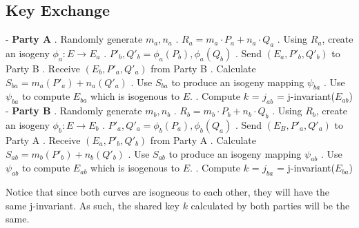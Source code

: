 \documentclass[10pt,twocolumn]{article} %
\begin{document}
\subsection{Key Exchange}

- \textbf{Party A} 
. Randomly generate $ m_{a},n_{a}$
. $R_{a} = m_{a}\cdot P_{a}+n_{a}\cdot Q_{a}$
. Using $R_{a}$, create an isogeny $\phi_{a}: E \rightarrow E_{a}$
. $P'_{b},Q'_{b}=\phi_{a}(P_{b}),\phi_{a}(Q_{b})$
. Send $(E_{a}, P'_{b}, Q'_{b})$ to Party B
. Receive $(E_b, P'_a, Q'_a)$ from Party B
. Calculate $S_{ba} = m_a(P'_a)+n_a(Q'_a)$ 
. Use $S_{ba}$ to produce an isogeny mapping $\psi_{ba}$
. Use $\psi_{ba}$ to compute $E_{ba}$ which is isogenous to $E$.
. Compute $k$ = $j_{ab}$ = j-invariant($E_{ab}$)
\newline
\newline
- \textbf{Party B}
. Randomly generate $ m_{b},n_{b}$
. $R_{b} = m_{b}\cdot P_{b}+n_{b}\cdot Q_{b}$
. Using $R_{b}$, create an isogeny $\phi_{b}: E \rightarrow E_{b}$
. $P'_{a},Q'_{a}=\phi_{b}(P_{a}),\phi_{b}(Q_{a})$
. Send $(E_B, P'_{a}, Q'_{a})$ to Party A
. Receive $(E_a, P'_b, Q'_b)$ from Party A
. Calculate $S_{ab} = m_b(P'_b)+n_b(Q'_b)$ 
. Use $S_{ab}$ to produce an isogeny mapping $\psi_{ab}$
. Use $\psi_{ab}$ to compute $E_{ab}$ which is isogenous to $E$.
. Compute $k$ = $j_{ba}$ = j-invariant($E_{ba}$)
\newline

\par Notice that since both curves are isogneous to each other, they will have the same j-invariant. As such, the shared key $k$ calculated by both parties will be the same.
\end{document}
